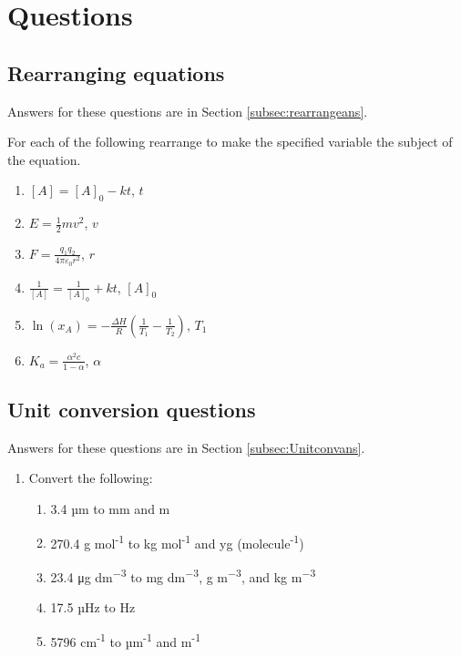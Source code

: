 \documentclass[
]{book}
\providecommand{\tightlist}{%
  \setlength{\itemsep}{0pt}\setlength{\parskip}{0pt}}
\begin{document}
\hypertarget{sec:QuestionsUnits}{%
\section{Questions}\label{sec:QuestionsUnits}}

\hypertarget{subsec:rearrange}{%
\subsection{Rearranging equations}\label{subsec:rearrange}}

Answers for these questions are in Section \ref{subsec:rearrangeans}.

For each of the following rearrange to make the specified variable the subject of the equation.

\begin{enumerate}
\def\labelenumi{\arabic{enumi}.}
\tightlist
\item
  \([A]= [A]_0 - kt\), \(t\)
\item
  \(E = \frac{1}{2}mv^2\), \(v\)
\item
  \(F = \frac{q_1 q_2}{4 \pi \varepsilon _0 r^2}\), \(r\)
\item
  \(\frac{1}{[A]}=\frac{1}{[A]_0}+kt\), \([A]_0\)
\item
  \(\ln (x_A)=-\frac{\Delta H}{R}(\frac{1}{T_1}-\frac{1}{T_2})\), \(T_1\)
\item
  \(K_a=\frac{\alpha ^2 c}{1- \alpha}\), \(\alpha\)
\end{enumerate}

\hypertarget{subsec:Unitconv}{%
\subsection{Unit conversion questions}\label{subsec:Unitconv}}

Answers for these questions are in Section \ref{subsec:Unitconvans}.

\begin{enumerate}
\def\labelenumi{\arabic{enumi}.}
\tightlist
\item
  Convert the following:

  \begin{enumerate}
  \def\labelenumii{\alph{enumii}.}
  \tightlist
  \item
    3.4 µm to mm and m
  \item
    270.4 g mol\textsuperscript{-1} to kg mol\textsuperscript{-1} and yg (molecule\textsuperscript{-1})
  \item
    23.4 μg dm\textsuperscript{−3} to mg dm\textsuperscript{−3}, g m\textsuperscript{−3}, and kg m\textsuperscript{−3}
  \item
    17.5 µHz to Hz
  \item
    5796 cm\textsuperscript{-1} to µm\textsuperscript{-1} and m\textsuperscript{-1}
  \end{enumerate}
\end{enumerate}
\end{document}
